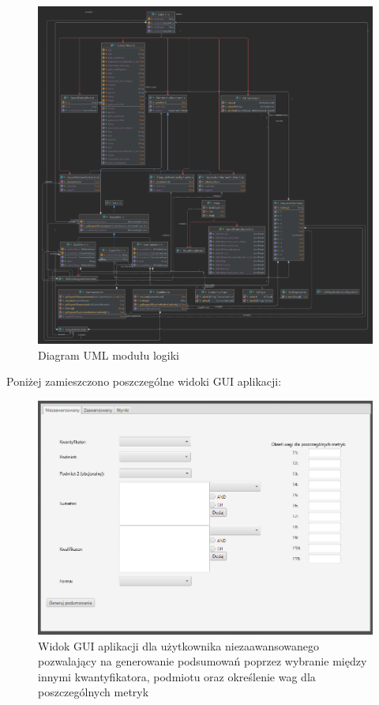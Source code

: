 \documentclass{classrep}
\begin{document}
  \begin{figure}[H]
    \includegraphics[scale = 0.1]{all}
    \caption{Diagram UML modułu logiki}
  \end{figure}
  Poniżej zamieszczono poszczególne widoki GUI aplikacji:
  
  \begin{figure}[H]
    \centering
    \includegraphics[scale = 0.5]{gui1}
    \caption{Widok GUI aplikacji dla użytkownika niezaawansowanego pozwalający na generowanie podsumowań poprzez wybranie między innymi kwantyfikatora, podmiotu oraz określenie wag dla poszczególnych metryk}
  \end{figure}
  
\end{document}
